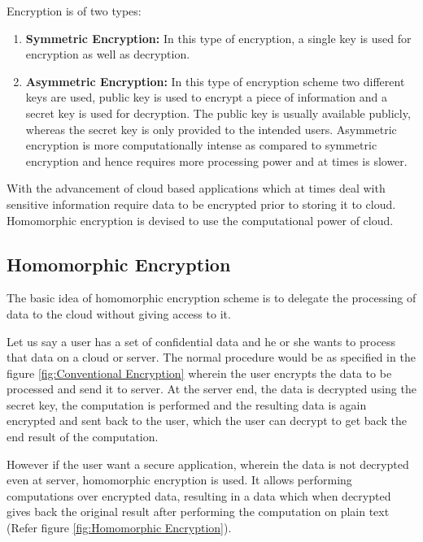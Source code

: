 \noindent Encryption is of two types:
\begin{enumerate}
\item
\textbf{Symmetric Encryption:} In this type of encryption, a single key is used for encryption as well as decryption.
\item
\textbf{Asymmetric Encryption:} In this type of encryption scheme two different keys are used, public key is used to encrypt a piece of information and a secret key is used for decryption. The public key is usually available publicly, whereas the secret key is only provided to the intended users. Asymmetric encryption is more computationally intense as compared to symmetric encryption and hence requires more processing power and at times is slower. 


\end{enumerate}
With the advancement of cloud based applications which at times deal with sensitive information require data to be encrypted prior to storing it to cloud. Homomorphic encryption is devised to use the computational power of cloud.
\subsection{Homomorphic Encryption}
The basic idea of homomorphic encryption scheme is to delegate the processing of data to the cloud without giving access to it.

\vspace{0.25cm}
\noindent Let us say a user has  a set of confidential data and he or she wants to process that data on a cloud or server. The normal procedure would be as specified in the figure \ref{fig:Conventional Encryption} wherein the user encrypts the data to be processed and send it to server. At the server end, the data is decrypted using the secret key, the computation is performed and the resulting data is again encrypted and sent back to the user, which the user can decrypt to get back the end result of the computation.


\vspace{0.25cm}
However if the user want a secure application, wherein the data is not decrypted even at server, homomorphic encryption is used. It allows performing computations over encrypted data, resulting in a data which when decrypted gives back the original result after performing the computation on plain text (Refer figure \ref{fig:Homomorphic Encryption}).

